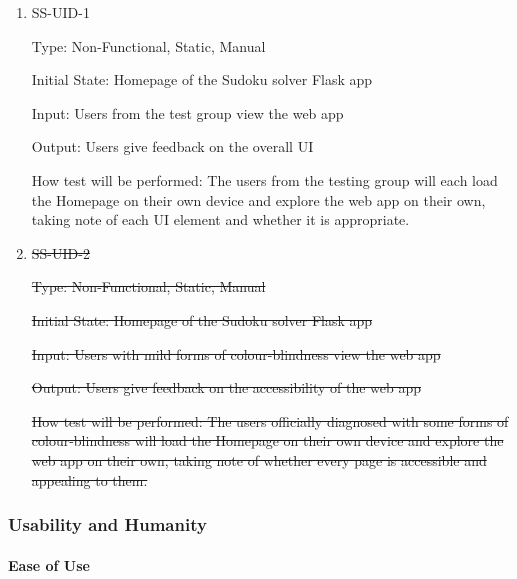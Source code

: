 \documentclass[11pt]{article}
\begin{document}
\begin{enumerate}

\item{SS-UID-1\\}

Type: Non-Functional, Static, Manual
					
Initial State: Homepage of the Sudoku solver Flask app
					
Input: Users from the test group view the web app
					
Output: Users give feedback on the overall UI
					
How test will be performed: The users from the testing group will each load the Homepage on their own device and explore the web app on their own, taking note of each UI element and whether it is appropriate.
					
\item{\sout{SS-UID-2\\}}

\sout{Type: Non-Functional, Static, Manual}
					
\sout{Initial State: Homepage of the Sudoku solver Flask app}
					
\sout{Input: Users with mild forms of colour-blindness view the web app}
					
\sout{Output: Users give feedback on the accessibility of the web app}
					
\sout{How test will be performed: The users officially diagnosed with some forms of colour-blindness will load the Homepage on their own device and explore the web app on their own, taking note of whether every page is accessible and appealing to them.}

\end{enumerate}

\subsubsection{Usability and Humanity}

\paragraph{Ease of Use}
\end{document}
